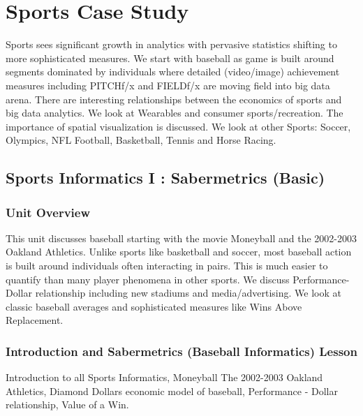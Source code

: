 

\chapter{Sports Case Study}\label{sports-case-study}

\FILENAME

Sports sees significant growth in analytics with pervasive statistics
shifting to more sophisticated measures. We start with baseball as game
is built around segments dominated by individuals where detailed
(video/image) achievement measures including PITCHf/x and FIELDf/x are
moving field into big data arena. There are interesting relationships
between the economics of sports and big data analytics. We look at
Wearables and consumer sports/recreation. The importance of spatial
visualization is discussed. We look at other Sports: Soccer, Olympics,
NFL Football, Basketball, Tennis and Horse Racing.

\section{Sports Informatics I : Sabermetrics
(Basic)}\label{sports-informatics-i-sabermetrics-basic}

\subsection{Unit Overview}\label{unit-overview}

This unit discusses baseball starting with the movie Moneyball and the
2002-2003 Oakland Athletics. Unlike sports like basketball and soccer,
most baseball action is built around individuals often interacting in
pairs. This is much easier to quantify than many player phenomena in
other sports. We discuss Performance-Dollar relationship including new
stadiums and media/advertising. We look at classic baseball averages and
sophisticated measures like Wins Above Replacement.




\subsection{Introduction and Sabermetrics (Baseball Informatics)
Lesson}\label{introduction-and-sabermetrics-baseball-informatics-lesson}

Introduction to all Sports Informatics, Moneyball The 2002-2003 Oakland
Athletics, Diamond Dollars economic model of baseball, Performance -
Dollar relationship, Value of a Win.


